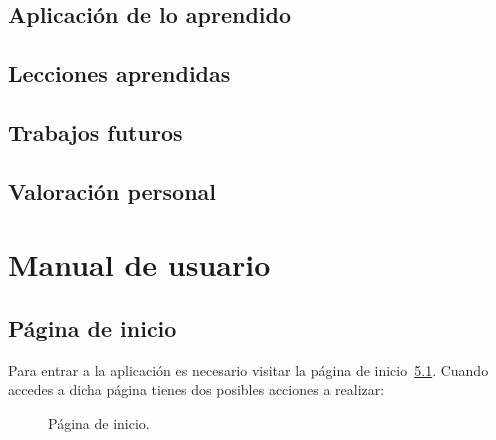 \documentclass[a4paper, 12pt]{book}
\begin{document}
\section{Aplicaci\'on de lo aprendido}
\label{sec:aplicacion}



\section{Lecciones aprendidas}
\label{sec:lecciones_aprendidas}



\section{Trabajos futuros}
\label{sec:trabajos_futuros}



\section{Valoraci\'on personal}
\label{sec:valoracion}






\cleardoublepage
\appendix
\chapter{Manual de usuario}
\label{app:manual}



\section{P\'agina de inicio}
Para entrar a la aplicaci\'on es necesario visitar la p\'agina de inicio~\ref{figura:inicio}. Cuando accedes a dicha p\'agina tienes dos posibles 
acciones a realizar:

\begin{figure}[htbp] 
  \centering
  \caption{P\'agina de inicio.}
  \label{figura:inicio}
\end{figure}
\end{document}
